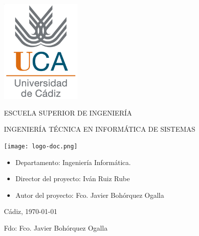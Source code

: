


\begin{center}

  \includegraphics[width=0.3\textwidth]{logo.png} \\
  

  \vspace{1.3cm}

  \Large{ESCUELA SUPERIOR DE INGENIERÍA} \\

  \vspace{1.0cm}

  \large{INGENIERÍA TÉCNICA EN INFORMÁTICA DE SISTEMAS} \\

  \vspace{1.3cm}

  \begin{center}
   \texttt{[image: logo-doc.png]}
   \end{center} 

  \vspace{1.3cm}

\end{center}

\begin{itemize}
\item \large{Departamento: Ingeniería Informática.}
\item \large{Director del proyecto: Iván Ruiz Rube}
\item \large{Autor del proyecto: Fco. Javier Bohórquez Ogalla}
\end{itemize}

\vspace{0.2cm}

\begin{flushright}
  \large{Cádiz, \today} \\

  \vspace{2.5cm}

  \large{Fdo: Fco. Javier Bohórquez Ogalla}
\end{flushright}

